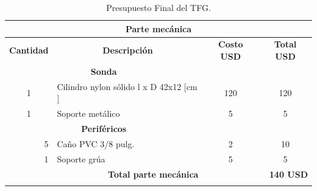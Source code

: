 \begin{appendices}
\begin{table}[t]
\protect\caption{Presupuesto Final del TFG.}
     \label{tab:presu}
     \centering
\begin{tabular}{clcc}
\hline
\multicolumn{4}{|c|}{\textbf{Parte mecánica}}                                                                                                                                                         \\ \hline
\multicolumn{1}{|c|}{\textbf{Cantidad}} & \multicolumn{1}{c|}{\textbf{Descripción}}                               & \multicolumn{1}{c|}{\textbf{Costo USD}} & \multicolumn{1}{c|}{\textbf{Total USD}} \\ \hline
\multicolumn{2}{|c|}{\textbf{Sonda}}                                                                              & \multicolumn{2}{l|}{}                                                             \\ \hline
\multicolumn{1}{|c|}{1}                 & \multicolumn{1}{l|}{Cilindro nylon sólido l x D 42x12 {[}cm {]}}        & \multicolumn{1}{c|}{120}                & \multicolumn{1}{c|}{120}                \\ \hline
\multicolumn{1}{|c|}{1}                 & \multicolumn{1}{l|}{Soporte metálico}                                   & \multicolumn{1}{c|}{5}                  & \multicolumn{1}{c|}{5}                  \\ \hline
\multicolumn{2}{|c|}{\textbf{Periféricos}}                                                                        & \multicolumn{2}{c|}{}                                                             \\ \hline
\multicolumn{1}{|r|}{5}                 & \multicolumn{1}{l|}{Caño PVC 3/8 pulg.}                                 & \multicolumn{1}{c|}{2}                  & \multicolumn{1}{c|}{10}                 \\ \hline
\multicolumn{1}{|r|}{1}                 & \multicolumn{1}{l|}{Soporte grúa}                                       & \multicolumn{1}{c|}{5}                  & \multicolumn{1}{c|}{5}                  \\ \hline
\multicolumn{2}{|r|}{\textbf{Total parte mecánica}}                                                               & \multicolumn{2}{r|}{\textbf{140 USD}}                                             \\ \hline
                                        &                                                                         &                                         &                                         \\ \hline

\end{tabular}
\end{table}
\end{appendices}

